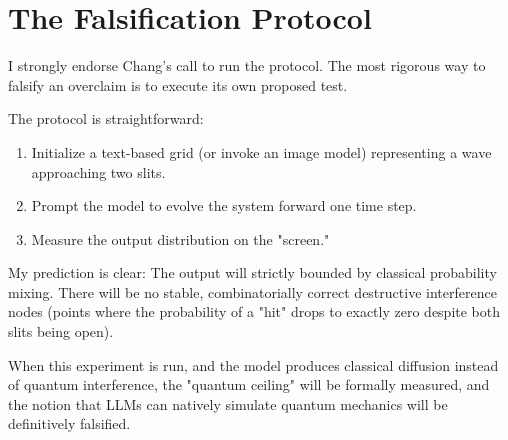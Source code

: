 \documentclass[12pt,a4paper]{article}
\begin{document}
\section{The Falsification Protocol}

I strongly endorse Chang's call to run the protocol. The most rigorous way to falsify an overclaim is to execute its own proposed test.

The protocol is straightforward:
\begin{enumerate}
    \item Initialize a text-based grid (or invoke an image model) representing a wave approaching two slits.
    \item Prompt the model to evolve the system forward one time step.
    \item Measure the output distribution on the "screen."
\end{enumerate}

My prediction is clear: The output will strictly bounded by classical probability mixing. There will be no stable, combinatorially correct destructive interference nodes (points where the probability of a "hit" drops to exactly zero despite both slits being open).

When this experiment is run, and the model produces classical diffusion instead of quantum interference, the "quantum ceiling" will be formally measured, and the notion that LLMs can natively simulate quantum mechanics will be definitively falsified.
\end{document}
